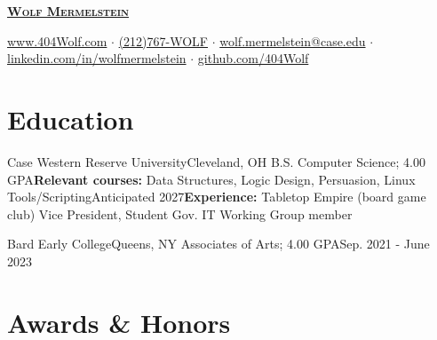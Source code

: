 \documentclass[letterpaper, 10pt]{article}
\begin{document}


\begin{center}
	\textbf{\Huge \scshape \href{https://404wolf.com}{Wolf Mermelstein}} \\ \vspace{4pt}

	\href{https://404wolf.com}{www.404Wolf.com}
	$\cdot$
	\small \href{tel:(+12127679653)}{(212)767-WOLF}
	$\cdot$
	\href{mailto:wolf.mermelstein@case.edu}{wolf.mermelstein@case.edu}
	$\cdot$
	\href{https://linkedin.com/in/wolfmermelstein}{linkedin.com/in/wolfmermelstein}
	$\cdot$
	\href{https://github.com/404wolf}{github.com/404Wolf}
\end{center}
\vspace{-18px}

\section{Education}
\resumeSubHeadingListStart
\resumeSubheading
{Case Western Reserve University}{Cleveland, OH}
{B.S. Computer Science; 4.00 GPA}{\textbf{Relevant courses:} Data Structures, Logic Design, Persuasion, Linux Tools/Scripting}{Anticipated 2027}{\textbf{Experience:} Tabletop Empire (board game club) Vice President, Student Gov. IT Working Group member}

\resumeSubheading
{Bard Early College}{Queens, NY}{}
{Associates of Arts;  4.00 GPA}{Sep. 2021 - June 2023}{}
\resumeSubHeadingListEnd

\section{Awards \& Honors}
\resumeSubHeadingListStart
{}





\resumeSubHeadingListEnd
\end{document}

